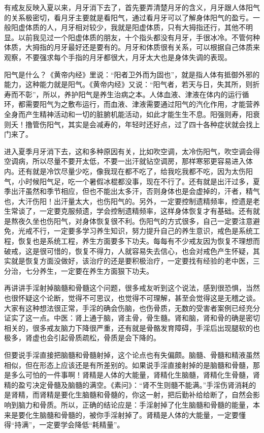 \documentclass{ctexart}
\begin{document}
有戒友反映入夏以来，月牙消下去了，首先要弄清楚月牙的含义，月牙跟人体阳气的关系极密切，看月牙主要就是看阳气，通过看月牙可以了解身体阳气的盈亏。一般阳虚体质的人，月牙相对较少，我就是阳虚体质，只有大拇指还行，其他不明显。以前我见过一个阳虚体质的朋友，十个指头都没有月牙，手很冰冷。不管何种体质，大拇指的月牙最好还是要有的。月牙和体质很有关系，可以根据自己体质来观察，不要强求每个手指的月牙都很大，月牙太大也是身体失调的表现。

阳气是什么？《黄帝内经》里说：“阳者卫外而为固也”，就是指人体有抵御外邪的能力，这种能力就是阳气。《黄帝内经》又说：“阳气者，若天与日，失其所，则折寿而不彰”，所以，养护阳气是养生治病之本。人体血液、津液在体内的运行循环，都需要阳气为之敷布运行，而血液、津液需要通过阳气的汽化作用，才能营养全身而产生精神活动和一切的脏腑机能活动，如此才能生生不息。阳强则寿，阳衰则夭！撸管伤阳气，其实是会减寿的，年轻时还好点，过了四十各种症状就会找上门来了。

进入夏季月牙消下去，这和多种原因有关，比如吹空调，太冷伤阳气，吹空调会得空调病，所以尽量不要开太低，不要一出汗就钻空调房，那样寒邪更容易进入体内。还有就是冷饮尽量少吃，像我现在都不吃了，给我吃我都不吃，因为太伤阳气，小时候阳气足，吃一个暑假冰棍都没事，现在不行了。还有就是出汗过多，夏季出汗虽然和季节相应，但也不能出太多汗，否则身体也是会虚掉的，汗者，精气也，大汗伤阳！出汗量太大，也伤阳气的。另外，一定要控制遗精频率，控遗是老生常谈了，一定要克服频遗，学会控制遗精频率，这样身体恢复才有基础。还有就是熬夜久坐也伤阳气，对身体恢复很不利。伤阳气的方式很多，自己一定要注意避免，光戒不行，一定要多学习养生知识，努力提升自己的养生意识，戒色是系统工程，恢复也是系统工程，养生方面要多下功夫。每每有不少戒友因为恢复不理想而破戒，这是很可惜的，恢复不得力，人就容易失去信心，也会对戒色产生怀疑，其实就是恢复方面没做好，该治疗的还是要积极治疗，一定要找有经验的老中医，三分治，七分养生，一定要在养生方面狠下功夫。

再讲讲手淫射掉脑髓和骨髓这个问题，很多戒友听到这个说法，感到很恐惧，当然也很怀疑这个论断，觉得不可思议，也觉得不可理解，甚至会觉得这是无稽之谈。大家有这种想法很正常，手淫的确会伤脑，也伤骨质，无数的受害者案例已经充分证实了这一点。中医：肾上通于脑，肾主骨，骨生髓。肾和脑，肾和骨的确是密切相关的，很多戒友脑力下降很严重，还有就是骨骼发育障碍，手淫后出现腿软的也极多，肾虚也会引起骨质疏松，骨质是会下降的。

但要说手淫直接把脑髓和骨髓射掉，这个论点也有失偏颇。脑髓、骨髓和精液虽然相似，但在形态上应该还是有所差别的。如果说手淫直接射掉的是脑髓和骨髓，那是多么可怕的一件事啊！肾精是人体的大能量，肾精化生脑髓，肾精化生骨髓，肾精的盈亏决定骨髓及脑髓的满空。《素问》：“肾不生则髓不能满。”手淫伤肾消耗的是肾精，而肾精是要化生脑髓和骨髓的，你这一射，把后勤补给给断了，自然会影响到脑力和骨质。所以，正确的结论应是：手淫射掉了化生脑髓和骨髓的能量，本来是要化生脑髓和骨髓的，被你手淫射掉了。肾精是人体的大能量，一定要懂得“持满”，一定要学会降低“耗精量”。
\end{document}

